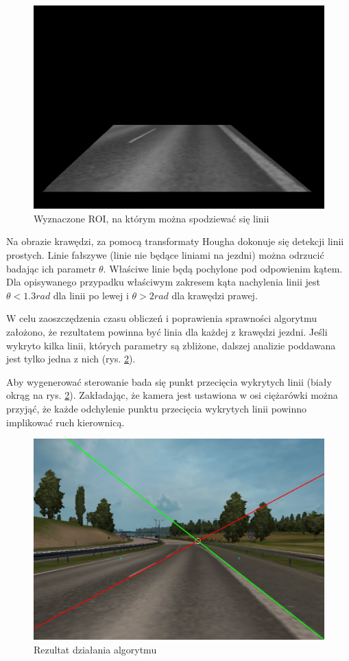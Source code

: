 \begin{figure}
  \centering
  \includegraphics[width=13cm]{img/alg1_roi.jpg}
  \caption{Wyznaczone ROI, na którym można spodziewać się linii}
  \label{fig:alg1_roi}
\end{figure}

Na obrazie krawędzi, za pomocą transformaty Hougha dokonuje się detekcji linii prostych. Linie fałszywe (linie nie będące liniami na jezdni) można odrzucić badając ich parametr $\theta$. Właściwe linie będą pochylone pod odpowienim kątem. Dla opisywanego przypadku właściwym zakresem kąta nachylenia linii jest $\theta < 1.3rad$ dla linii po lewej i $\theta > 2rad$ dla krawędzi prawej.

W celu zaoszczędzenia czasu obliczeń i poprawienia sprawności algorytmu założono, że rezultatem powinna być linia dla każdej z krawędzi jezdni. Jeśli wykryto kilka linii, których parametry są zbliżone, dalszej analizie poddawana jest tylko jedna z nich (rys. \ref{fig:alg1_res}).

Aby wygenerować sterowanie bada się punkt przecięcia wykrytych linii (biały okrąg na rys. \ref{fig:alg1_res}). Zakładając, że kamera jest ustawiona w osi ciężarówki można przyjąć, że każde odchylenie punktu przecięcia wykrytych linii powinno implikować ruch kierownicą.

\begin{figure}
  \centering
  \includegraphics[width=13cm]{img/alg1_res.jpg}
  \caption{Rezultat działania algorytmu}
  \label{fig:alg1_res}
\end{figure}

